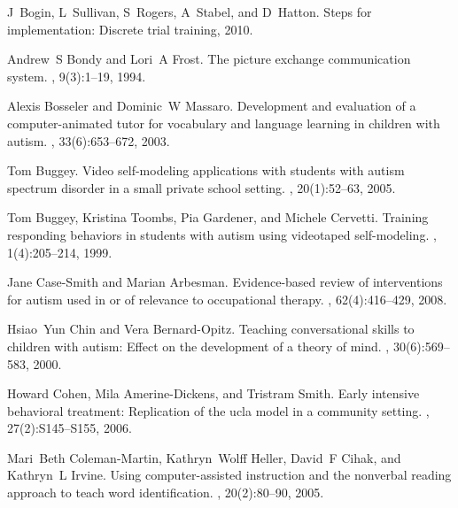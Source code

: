 \documentclass{ut-thesis}
\begin{document}
\begin{thebibliography}{100}
J~Bogin, L~Sullivan, S~Rogers, A~Stabel, and D~Hatton.
\newblock Steps for implementation: Discrete trial training, 2010.

Andrew~S Bondy and Lori~A Frost.
\newblock The picture exchange communication system.
,
  9(3):1--19, 1994.

Alexis Bosseler and Dominic~W Massaro.
\newblock Development and evaluation of a computer-animated tutor for
  vocabulary and language learning in children with autism.
, 33(6):653--672,
  2003.

Tom Buggey.
\newblock Video self-modeling applications with students with autism spectrum
  disorder in a small private school setting.
,
  20(1):52--63, 2005.

Tom Buggey, Kristina Toombs, Pia Gardener, and Michele Cervetti.
\newblock Training responding behaviors in students with autism using
  videotaped self-modeling.
, 1(4):205--214,
  1999.

Jane Case-Smith and Marian Arbesman.
\newblock Evidence-based review of interventions for autism used in or of
  relevance to occupational therapy.
, 62(4):416--429, 2008.

Hsiao~Yun Chin and Vera Bernard-Opitz.
\newblock Teaching conversational skills to children with autism: Effect on the
  development of a theory of mind.
, 30(6):569--583,
  2000.

Howard Cohen, Mila Amerine-Dickens, and Tristram Smith.
\newblock Early intensive behavioral treatment: Replication of the ucla model
  in a community setting.
,
  27(2):S145--S155, 2006.

Mari~Beth Coleman-Martin, Kathryn~Wolff Heller, David~F Cihak, and Kathryn~L
  Irvine.
\newblock Using computer-assisted instruction and the nonverbal reading
  approach to teach word identification.
,
  20(2):80--90, 2005.


\end{thebibliography}
\end{document}
